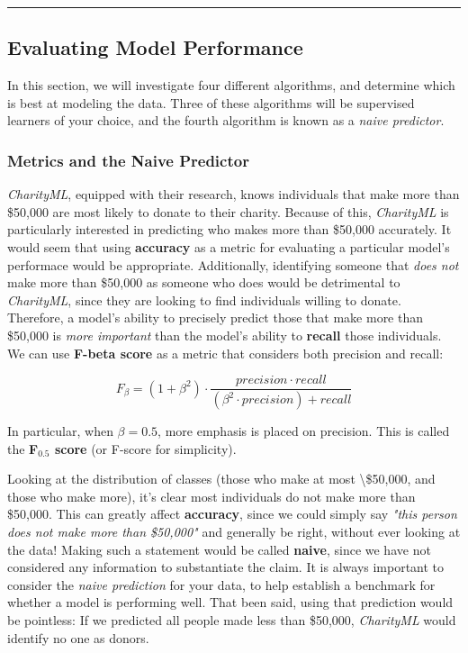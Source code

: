\documentclass[11pt]{article}
\begin{document}
    \begin{center}\rule{0.5\linewidth}{\linethickness}\end{center}

\subsection{Evaluating Model
Performance}\label{evaluating-model-performance}

In this section, we will investigate four different algorithms, and
determine which is best at modeling the data. Three of these algorithms
will be supervised learners of your choice, and the fourth algorithm is
known as a \emph{naive predictor}.

    \subsubsection{Metrics and the Naive
Predictor}\label{metrics-and-the-naive-predictor}

\emph{CharityML}, equipped with their research, knows individuals that
make more than \$50,000 are most likely to donate to their charity.
Because of this, \emph{CharityML} is particularly interested in
predicting who makes more than \$50,000 accurately. It would seem that
using \textbf{accuracy} as a metric for evaluating a particular model's
performace would be appropriate. Additionally, identifying someone that
\emph{does not} make more than \$50,000 as someone who does would be
detrimental to \emph{CharityML}, since they are looking to find
individuals willing to donate. Therefore, a model's ability to precisely
predict those that make more than \$50,000 is \emph{more important} than
the model's ability to \textbf{recall} those individuals. We can use
\textbf{F-beta score} as a metric that considers both precision and
recall:

\[ F_{\beta} = (1 + \beta^2) \cdot \frac{precision \cdot recall}{\left( \beta^2 \cdot precision \right) + recall} \]

In particular, when \(\beta = 0.5\), more emphasis is placed on
precision. This is called the \textbf{F\(_{0.5}\) score} (or F-score for
simplicity).

Looking at the distribution of classes (those who make at most
\textbackslash{}\$50,000, and those who make more), it's clear most
individuals do not make more than \$50,000. This can greatly affect
\textbf{accuracy}, since we could simply say \emph{"this person does not
make more than \$50,000"} and generally be right, without ever looking
at the data! Making such a statement would be called \textbf{naive},
since we have not considered any information to substantiate the claim.
It is always important to consider the \emph{naive prediction} for your
data, to help establish a benchmark for whether a model is performing
well. That been said, using that prediction would be pointless: If we
predicted all people made less than \$50,000, \emph{CharityML} would
identify no one as donors.
\end{document}
